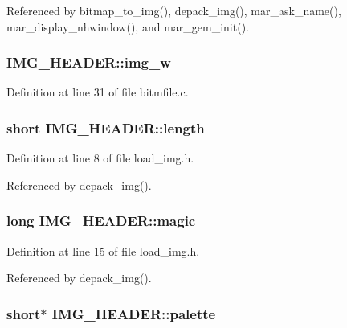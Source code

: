 Referenced by bitmap\+\_\+to\+\_\+img(), depack\+\_\+img(), mar\+\_\+ask\+\_\+name(), mar\+\_\+display\+\_\+nhwindow(), and mar\+\_\+gem\+\_\+init().

\hypertarget{structIMG__HEADER_a45fcc47a3c57f859f69315792c681377}{
\subsubsection[{img\+\_\+w}]{ I\+M\+G\+\_\+\+H\+E\+A\+D\+E\+R\+::img\+\_\+w}}\label{structIMG__HEADER_a45fcc47a3c57f859f69315792c681377}


Definition at line 31 of file bitmfile.\+c.

\hypertarget{structIMG__HEADER_a9b880fd83909bcba7f3e849b57a9a0c0}{
\subsubsection[{length}]{\setlength{\rightskip}{0pt plus 5cm}short I\+M\+G\+\_\+\+H\+E\+A\+D\+E\+R\+::length}}\label{structIMG__HEADER_a9b880fd83909bcba7f3e849b57a9a0c0}


Definition at line 8 of file load\+\_\+img.\+h.



Referenced by depack\+\_\+img().

\hypertarget{structIMG__HEADER_abbbc6e8856fd81c6feef3add32208f3f}{
\subsubsection[{magic}]{\setlength{\rightskip}{0pt plus 5cm}long I\+M\+G\+\_\+\+H\+E\+A\+D\+E\+R\+::magic}}\label{structIMG__HEADER_abbbc6e8856fd81c6feef3add32208f3f}


Definition at line 15 of file load\+\_\+img.\+h.



Referenced by depack\+\_\+img().

\hypertarget{structIMG__HEADER_a62627863acc4854672b716af0f69a4b9}{
\subsubsection[{palette}]{\setlength{\rightskip}{0pt plus 5cm}short$\ast$ I\+M\+G\+\_\+\+H\+E\+A\+D\+E\+R\+::palette}}\label{structIMG__HEADER_a62627863acc4854672b716af0f69a4b9}


